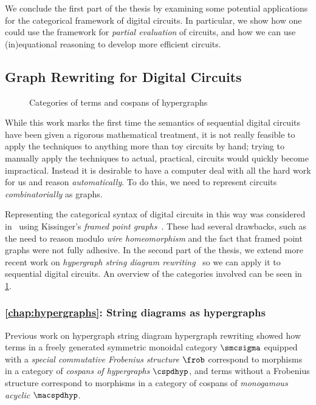 We conclude the first part of the thesis by examining some potential
applications for the categorical framework of digital circuits.
In particular, we show how one could use the framework for
\emph{partial evaluation} of circuits, and how we can use (in)equational
reasoning to develop more efficient circuits.

\subsection{Graph Rewriting for Digital Circuits}

\begin{figure}
    \centering
    
    \caption{Categories of terms and cospans of hypergraphs}
    \label{fig:hypergraphs-map}
\end{figure}

While this work marks the first time the semantics of sequential digital
circuits have been given a rigorous mathematical treatment, it is not really
feasible to apply the techniques to anything more than toy circuits by hand;
trying to manually apply the techniques to actual, practical, circuits would
quickly become impractical.
Instead it is desirable to have a computer deal with all the hard work
for us and reason \emph{automatically}.
To do this, we need to represent circuits \emph{combinatorially} as graphs.

Representing the categorical syntax of digital circuits in this way was
considered in~\cite{ghica2017diagrammatic} using
Kissinger's \emph{framed point graphs}~\cite{kissinger2012pictures}.
These had several drawbacks, such as the need to reason modulo
\emph{wire homeomorphism} and the fact that framed point graphs were not fully
adhesive.
In the second part of the thesis, we extend more recent work on
\emph{hypergraph string diagram rewriting}~\cite{bonchi2022string,bonchi2022stringa,bonchi2022stringb}
so we can apply it to sequential digital circuits.
An overview of the categories involved can be seen in
\cref{fig:hypergraphs-map}.

\subsubsection{\cref{chap:hypergraphs}: String diagrams as hypergraphs}

Previous work on hypergraph string diagram hypergraph rewriting showed how terms
in a freely generated symmetric monoidal category \(\smcsigma\) equipped with a
\emph{special commutative Frobenius structure} \(\frob\) correspond to morphisms
in a category of \emph{cospans of hypergraphs} \(\cspdhyp\), and terms without a
Frobenius structure correspond to morphisms in a category of
cospans of \emph{monogamous acyclic} \(\macspdhyp\).

